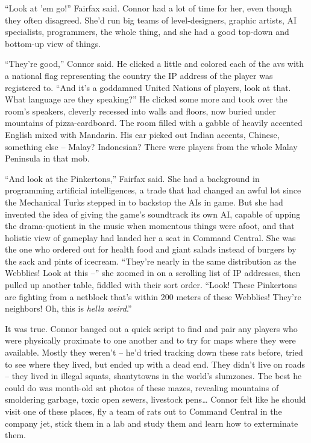 ``Look at 'em go!'' Fairfax said. Connor had a lot of time for her,
even though they often disagreed. She'd run big teams of
level-designers, graphic artists, AI specialists, programmers, the
whole thing, and she had a good top-down and bottom-up view of
things.

``They're good,'' Connor said. He clicked a little and colored each
of the avs with a national flag representing the country the IP
address of the player was registered to. ``And it's a goddamned
United Nations of players, look at that. What language are they
speaking?'' He clicked some more and took over the room's speakers,
cleverly recessed into walls and floors, now buried under mountains
of pizza-cardboard. The room filled with a gabble of heavily
accented English mixed with Mandarin. His ear picked out Indian
accents, Chinese, something else -- Malay? Indonesian? There were
players from the whole Malay Peninsula in that mob.

``And look at the Pinkertons,'' Fairfax said. She had a background in
programming artificial intelligences, a trade that had changed an
awful lot since the Mechanical Turks stepped in to backstop the AIs
in game. But she had invented the idea of giving the game's
soundtrack its own AI, capable of upping the drama-quotient in the
music when momentous things were afoot, and that holistic view of
gameplay had landed her a seat in Command Central. She was the one
who ordered out for health food and giant salads instead of burgers
by the sack and pints of icecream. ``They're nearly in the same
distribution as the Webblies! Look at this --'' she zoomed in on a
scrolling list of IP addresses, then pulled up another table,
fiddled with their sort order. ``Look! These Pinkertons are fighting
from a netblock that's within 200 meters of these Webblies! They're
neighbors! Oh, this is \emph{hella weird}.''

It was true. Connor banged out a quick script to find and pair any
players who were physically proximate to one another and to try for
maps where they were available. Mostly they weren't -- he'd tried
tracking down these rats before, tried to see where they lived, but
ended up with a dead end. They didn't live on roads -- they lived
in illegal squats, shantytowns in the world's slumzones. The best
he could do was month-old sat photos of these mazes, revealing
mountains of smoldering garbage, toxic open sewers, livestock
pens\ldots{} Connor felt like he should visit one of these places, fly a
team of rats out to Command Central in the company jet, stick them
in a lab and study them and learn how to exterminate them.

